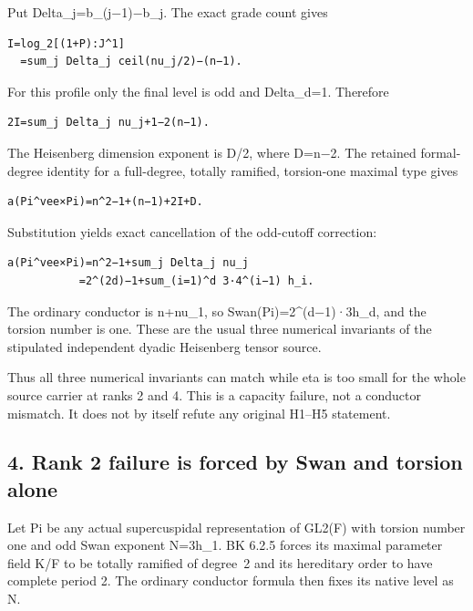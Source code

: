 Put Delta\_j=b\_(j−1)−b\_j. The exact grade count gives

\begin{Verbatim}[fontsize=\small,breaklines=true,breakanywhere=true]
I=log_2[(1+P):J^1]
  =sum_j Delta_j ceil(nu_j/2)−(n−1).
\end{Verbatim}

For this profile only the final level is odd and Delta\_d=1. Therefore

\begin{Verbatim}[fontsize=\small,breaklines=true,breakanywhere=true]
2I=sum_j Delta_j nu_j+1−2(n−1).
\end{Verbatim}

The Heisenberg dimension exponent is D/2, where D=n−2. The retained
formal-degree identity for a full-degree, totally ramified, torsion-one
maximal type gives

\begin{Verbatim}[fontsize=\small,breaklines=true,breakanywhere=true]
a(Pi^vee×Pi)=n^2−1+(n−1)+2I+D.
\end{Verbatim}

Substitution yields exact cancellation of the odd-cutoff correction:

\begin{Verbatim}[fontsize=\small,breaklines=true,breakanywhere=true]
a(Pi^vee×Pi)=n^2−1+sum_j Delta_j nu_j
           =2^(2d)−1+sum_(i=1)^d 3·4^(i−1) h_i.
\end{Verbatim}

The ordinary conductor is n+nu\_1, so Swan(Pi)=2\^{}(d−1)·3h\_d, and the
torsion number is one. These are the usual three numerical invariants of
the stipulated independent dyadic Heisenberg tensor source.

Thus all three numerical invariants can match while eta is too small for
the whole source carrier at ranks 2 and 4. This is a capacity failure, not
a conductor mismatch. It does not by itself refute any original H1--H5
statement.

\hypertarget{dyadic_capacity-rank2-failure-is-forced-by-swan-and-torsion-alone}{%
\subsection{4. Rank 2 failure is forced by Swan and torsion
alone}\label{dyadic_capacity-rank2-failure-is-forced-by-swan-and-torsion-alone}}

Let Pi be any actual supercuspidal representation of GL2(F) with torsion
number one and odd Swan exponent N=3h\_1. BK 6.2.5 forces its maximal
parameter field K/F to be totally ramified of degree~2 and its hereditary
order to have complete period 2. The ordinary conductor formula then
fixes its native level as N.

